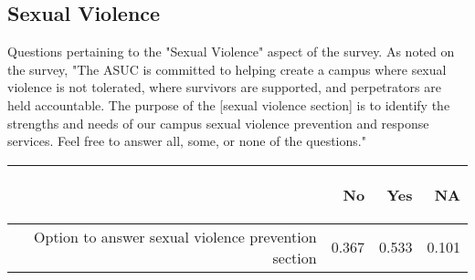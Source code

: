 \documentclass{article}\usepackage[]{graphicx}\usepackage[]{color}
\begin{document}
\subsection{Sexual Violence}
Questions pertaining to the "Sexual Violence" aspect of the survey. As noted on the survey, "The ASUC is committed to helping create a campus where sexual violence is not
tolerated, where survivors are supported, and perpetrators are held accountable.
The purpose of the [sexual violence section] is to identify the strengths and needs of our campus
sexual violence prevention and response services. Feel free to answer all, some,
or none of the questions."
\begin{table}[ht]
\centering
\begin{tabular}{rrrr}
  \hline
 & \begin{sideways} No \end{sideways} & \begin{sideways} Yes \end{sideways} & \begin{sideways} NA \end{sideways} \\ 
  \hline
Option to answer sexual violence prevention section & 0.367 & 0.533 & 0.101 \\ 
   \hline
\end{tabular}
\end{table}
\end{document}

